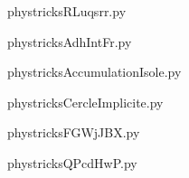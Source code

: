     \newcommand{\CaptionFigRLuqsrr}{<+Type your caption here+>}
    \begin{center}
        
    \end{center}
    phystricksRLuqsrr.py

    

    \clearpage
    


    \newcommand{\CaptionFigAdhIntFr}{<+Type your caption here+>}
    \begin{center}
        
    \end{center}
    phystricksAdhIntFr.py

    

    \clearpage
    


    \newcommand{\CaptionFigAccumulationIsole}{<+Type your caption here+>}
    \begin{center}
        
    \end{center}
    phystricksAccumulationIsole.py

    

    \clearpage
    


    \newcommand{\CaptionFigCercleImplicite}{<+Type your caption here+>}
    \begin{center}
        
    \end{center}
    phystricksCercleImplicite.py

    

    \clearpage
    


    \newcommand{\CaptionFigFGWjJBX}{<+Type your caption here+>}
    \begin{center}
        
    \end{center}
    phystricksFGWjJBX.py

    

    \clearpage
    


    \newcommand{\CaptionFigQPcdHwP}{<+Type your caption here+>}
    \begin{center}
        
    \end{center}
    phystricksQPcdHwP.py


